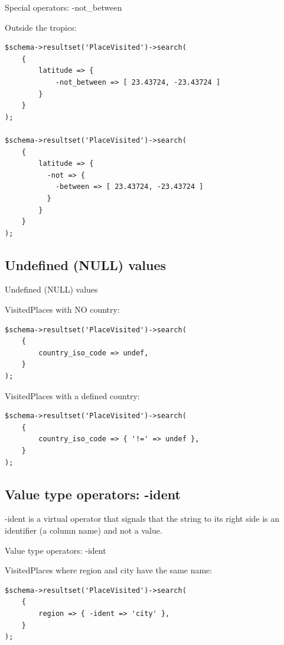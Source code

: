 \begin{frame}[fragile]{Special operators: -not\_between}

Outside the tropics:

\begin{lstlisting}
$schema->resultset('PlaceVisited')->search(
    {
        latitude => {
            -not_between => [ 23.43724, -23.43724 ]
        }
    }
);

$schema->resultset('PlaceVisited')->search(
    {
        latitude => {
          -not => {
            -between => [ 23.43724, -23.43724 ]
          }
        }
    }
);
\end{lstlisting}
\end{frame}

\subsection{Undefined (NULL) values}
\begin{frame}[fragile]{Undefined (NULL) values}

VisitedPlaces with NO country:

\begin{lstlisting}
$schema->resultset('PlaceVisited')->search(
    {
        country_iso_code => undef,
    }
);
\end{lstlisting}

VisitedPlaces with a defined country:

\begin{lstlisting}
$schema->resultset('PlaceVisited')->search(
    {
        country_iso_code => { '!=' => undef },
    }
);
\end{lstlisting}
\end{frame}

\subsection{Value type operators: -ident}

-ident is a virtual operator that signals that the string to its right side
is an identifier (a column name) and not a value.

\begin{frame}[fragile]{Value type operators: -ident}

VisitedPlaces where region and city have the same name:

\begin{lstlisting}
$schema->resultset('PlaceVisited')->search(
    {
        region => { -ident => 'city' },
    }
);
\end{lstlisting}
\end{frame}

